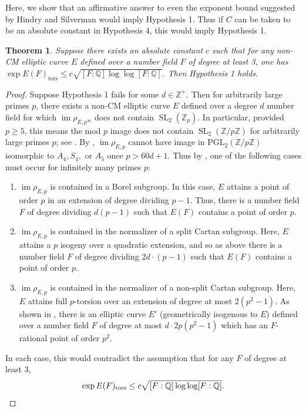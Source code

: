 \documentclass{amsart}
\newtheorem{theorem}{Theorem}
\theoremstyle{definition}
\newcommand{\tors}{\operatorname{tors}}
\newcommand{\Q}{\mathbb{Q}}
\newcommand{\Z}{\mathbb{Z}}
\newcommand{\SL}{\operatorname{SL}}
\DeclareMathOperator{\im}{im}
\begin{document}
Here, we show that an affirmative answer to even the exponent bound suggested by Hindry and Silverman would imply Hypothesis 1. Thus if $C$ can be taken to be an absolute constant in Hypothesis 4, this would imply Hypothesis 1.

\begin{theorem}\label{LastResult}
    Suppose there exists an absolute constant $c$ such that for any non-CM elliptic curve $E$ defined over a number field $F$ of degree at least 3, one has $\exp E(F)_{\tors} \leq c \sqrt{[F:\Q] \log \log [F:\Q]}$. Then Hypothesis 1 holds.
\end{theorem}

\begin{proof}
   Suppose Hypothesis 1 fails for some $d \in \Z^+$. Then for arbitrarily large primes $p$, there exists a non-CM elliptic curve $E$ defined over a degree $d$ number field for which $\im \rho_{E,p^{\infty}}$ does not contain $\SL_2(\Z_{p})$. In particular, provided $p \geq 5$, this means the mod $p$ image does not contain $\SL_2(\Z/p\Z)$ for arbitrarily large primes $p$; see \cite[Lemma 2.12]{Greicius10}. By \cite[Remark 2.1]{GhateParent}, $\im \rho_{E,p}$ cannot have image in $\text{PGL}_2(\Z/p\Z)$ isomorphic to $A_4,S_4,$ or $A_5$ once $p>60d+1$. Thus by
    \cite[$\S2$]{serre72}, one of the following cases must occur for infinitely many primes $p$:
    \begin{enumerate}
        \item $\im \rho_{E,p}$ is contained in a Borel subgroup. In this case, $E$ attains a point of order $p$ in an extension of degree dividing $p-1$. Thus, there is a number field $F$ of degree dividing $d(p-1)$ such that $E(F)$ contains a point of order $p$.
        \item $\im \rho_{E,p}$ is contained in the normalizer of a split Cartan subgroup. Here, $E$ attains a $p$ isogeny over a quadratic extension, and so as above there is a number field $F$ of degree dividing $2d \cdot (p-1)$ such that $E(F)$ contains a point of order $p$.
         \item $\im \rho_{E,p}$ is contained in the normalizer of a non-split Cartan subgroup. Here, $E$ attains full $p$-torsion over an extension of degree at most $2(p^2-1)$. As shown in \cite[Theorem 3.1]{OddDegQCurve}, there is an elliptic curve $E'$ (geometrically isogenous to $E$) defined over a number field $F$ of degree at most $d\cdot 2p(p^2-1)$ which has an $F$-rational point of order $p^2$.
    \end{enumerate}
    In each case, this would contradict the assumption that for any $F$ of degree at least 3,
    \[
    \exp E(F)_{\tors} \leq c \sqrt{[F:\Q] \log \log [F:\Q]}.
    \qedhere
    \] 
\end{proof}




\end{document}
